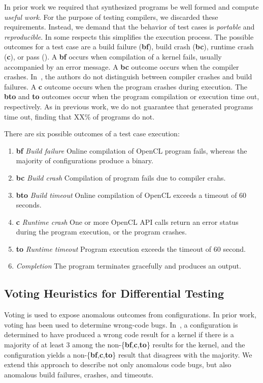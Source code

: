 In prior work we required that synthesized programs be well formed and compute \emph{useful work}. For the purpose of testing compilers, we discarded these requirements. Instead, we demand that the behavior of test cases is \emph{portable} and \emph{reproducible}. In some respects this simplifies the execution process. The possible outcomes for a test case are a build failure (\textbf{bf}), build crash (\textbf{bc}), runtime crash (\textbf{c}), or pass (\textbf{\cmark}). A \textbf{bf} occurs when compilation of a kernel fails, usually accompanied by an error message. A \textbf{bc} outcome occurs when the compiler crashes. In~\cite{Lidbury2015a}, the authors do not distinguish between compiler crashes and build failures. A \textbf{c} outcome occurs when the program crashes during execution. The \textbf{bto} and \textbf{to} outcomes occur when the program compilation or execution time out, respectively. As in previous work, we do not guarantee that generated programs time out, finding that XX\% of programs do not.

There are six possible outcomes of a test case execution:
%
\begin{enumerate}
	\item \textbf{bf} \emph{Build failure} Online compilation of OpenCL program fails, whereas the majority of configurations produce a binary.
	\item \textbf{bc} \emph{Build crash} Compilation of program fails due to compiler crahs.
	\item \textbf{bto} \emph{Build timeout} Online compilation of OpenCL exceeds a timeout of 60 seconds.
	\item \textbf{c} \emph{Runtime crash} One or more OpenCL API calls return an error status during the program execution, or the program crashes.
	\item \textbf{to} \emph{Runtime timeout} Program execution exceeds the timeout of 60 second.
	\item \textbf{\cmark} \emph{Completion} The program terminates gracefully and produces an output.
\end{enumerate}


\subsection{Voting Heuristics for Differential Testing}

Voting is used to expose anomalous outcomes from configurations. In prior work, voting has been used to determine wrong-code bugs. In~\cite{Lidbury2015a}, a configuration is determined to have produced a wrong code result for a kernel if there is a majority of at least 3 among the non-\{\textbf{bf},\textbf{c},\textbf{to}\} results for the kernel, and the configuration yields a non-\{\textbf{bf},\textbf{c},\textbf{to}\} result that disagrees with the majority. We extend this approach to describe not only anomalous code bugs, but also anomalous build failures, crashes, and timeouts.

